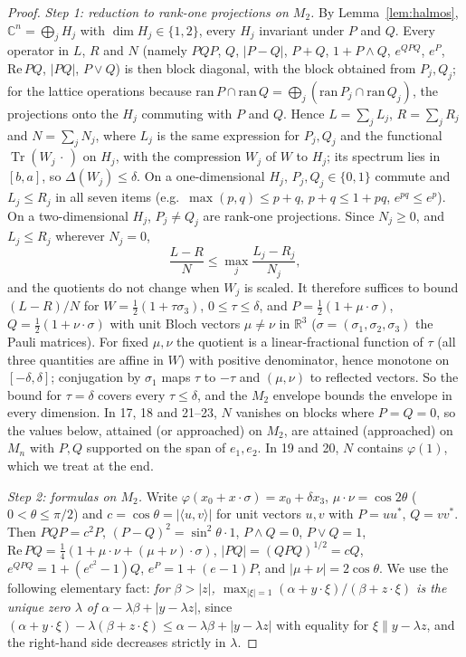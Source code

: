 \documentclass[11pt]{article}
\DeclareMathOperator{\Tr}{Tr}
\newcommand{\C}{\mathbb{C}}
\newcommand{\R}{\mathbb{R}}
\renewcommand{\Re}{\mathrm{Re}\,}
\theoremstyle{plain}
\theoremstyle{definition}
\theoremstyle{remark}
\begin{document}
\begin{proof}
\emph{Step 1: reduction to rank-one projections on $M_2$.} By Lemma~\ref{lem:halmos}, $\C^n=\bigoplus_jH_j$ with
$\dim H_j\in\{1,2\}$, every $H_j$ invariant under $P$ and $Q$. Every operator in $L$, $R$ and $N$ (namely $PQP$, $Q$,
$|P-Q|$, $P+Q$, $1+P\wedge Q$, $e^{QPQ}$, $e^P$, $\Re PQ$, $|PQ|$, $P\vee Q$) is then block diagonal, with the block
obtained from $P_j,Q_j$; for the lattice operations because $\mathrm{ran}\,P\cap\mathrm{ran}\,Q=\bigoplus_j(\mathrm{ran}\,
P_j\cap\mathrm{ran}\,Q_j)$, the projections onto the $H_j$ commuting with $P$ and $Q$. Hence $L=\sum_jL_j$, $R=\sum_jR_j$ and
$N=\sum_jN_j$, where $L_j$ is the same expression for $P_j,Q_j$ and the functional $\Tr(W_j\,\cdot\,)$ on $H_j$, with the
compression $W_j$ of $W$ to $H_j$; its spectrum lies in $[b,a]$, so $\Delta(W_j)\le\delta$. On a one-dimensional $H_j$,
$P_j,Q_j\in\{0,1\}$ commute and $L_j\le R_j$ in all seven items (e.g.\ $\max(p,q)\le p+q$, $p+q\le1+pq$, $e^{pq}\le e^p$).
On a two-dimensional $H_j$, $P_j\ne Q_j$ are rank-one projections. Since $N_j\ge0$, and $L_j\le R_j$ wherever $N_j=0$,
\[
  \frac{L-R}N\le\max_j\frac{L_j-R_j}{N_j},
\]
and the quotients do not change when $W_j$ is scaled. It therefore suffices to bound $(L-R)/N$ for
$W=\frac12(1+\tau\sigma_3)$, $0\le\tau\le\delta$, and $P=\frac12(1+\mu\cdot\sigma)$, $Q=\frac12(1+\nu\cdot\sigma)$ with unit
Bloch vectors $\mu\ne\nu$ in $\R^3$ ($\sigma=(\sigma_1,\sigma_2,\sigma_3)$ the Pauli matrices). For fixed $\mu,\nu$ the
quotient is a linear-fractional function of $\tau$ (all three quantities are affine in $W$) with positive denominator, hence
monotone on $[-\delta,\delta]$; conjugation by $\sigma_1$ maps $\tau$ to $-\tau$ and $(\mu,\nu)$ to reflected vectors. So
the bound for $\tau=\delta$ covers every $\tau\le\delta$, and the $M_2$ envelope bounds the envelope in every dimension.
In 17, 18 and 21--23, $N$ vanishes on blocks where $P=Q=0$, so the values below, attained (or approached) on $M_2$, are
attained (approached) on $M_n$ with $P,Q$ supported on the span of $e_1,e_2$. In 19 and 20, $N$ contains $\varphi(1)$,
which we treat at the end.

\emph{Step 2: formulas on $M_2$.} Write $\varphi(x_0+x\cdot\sigma)=x_0+\delta x_3$, $\mu\cdot\nu=\cos2\theta$
($0<\theta\le\pi/2$) and $c=\cos\theta=|\langle u,v\rangle|$ for unit vectors $u,v$ with $P=uu^*$, $Q=vv^*$. Then
$PQP=c^2P$, $(P-Q)^2=\sin^2\theta\cdot1$, $P\wedge Q=0$, $P\vee Q=1$, $\Re PQ=\frac14(1+\mu\cdot\nu+(\mu+\nu)\cdot\sigma)$,
$|PQ|=(QPQ)^{1/2}=cQ$, $e^{QPQ}=1+(e^{c^2}-1)Q$, $e^P=1+(e-1)P$, and $|\mu+\nu|=2\cos\theta$. We use the following
elementary fact: \emph{for $\beta>|z|$, $\max_{|\xi|=1}(\alpha+y\cdot\xi)/(\beta+z\cdot\xi)$ is the unique zero $\lambda$ of
$\alpha-\lambda\beta+|y-\lambda z|$}, since $(\alpha+y\cdot\xi)-\lambda(\beta+z\cdot\xi)\le\alpha-\lambda\beta+|y-\lambda z|$
with equality for $\xi\parallel y-\lambda z$, and the right-hand side decreases strictly in $\lambda$.


\end{proof}
\end{document}
